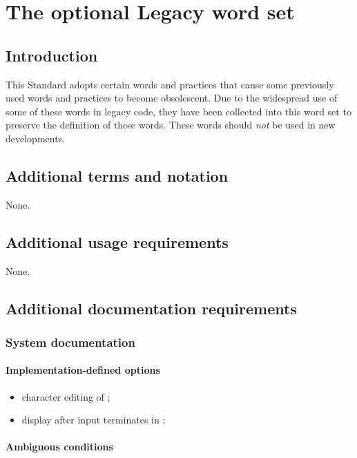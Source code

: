 \chapter{The optional Legacy word set} %

\section{Introduction} %

This Standard adopts certain words and practices that cause
some previously used words and practices to become obsolescent.
Due to the widespread use of some of these words in legacy code,
they have been collected into this word set to preserve the
definition of these words.  These words should \emph{not} be
used in new developments.

\section{Additional terms and notation} %

None.

\section{Additional usage requirements} %

None.

\section{Additional documentation requirements} %

\subsection{System documentation} %

\subsubsection{Implementation-defined options} %

\begin{itemize}
\item character editing of ;
\item display after input terminates in ;
\end{itemize}

\subsubsection{Ambiguous conditions} %

